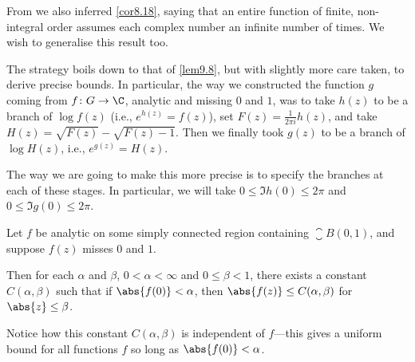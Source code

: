 From  we also inferred \autoref{cor8.18}, saying that an entire function of finite, non-integral order assumes each complex number an infinite number of times.
We wish to generalise this result too.

The strategy boils down to that of \autoref{lem9.8}, but with slightly more care taken, to derive precise bounds.
In particular, the way we constructed the function $g$ coming from $f \colon G \to \C$, analytic and missing $0$ and $1$, was to take $h(z)$ to be a branch of $\log f(z)$ (i.e., $e^{h(z)} = f(z)$), set $F(z) = \frac{1}{2 \pi i} h(z)$, and take $H(z) = \sqrt{F(z)} - \sqrt{F(z) - 1}$.
Then we finally took $g(z)$ to be a branch of $\log H(z)$, i.e., $e^{g(z)} = H(z)$.

The way we are going to make this more precise is to specify the branches at each of these stages.
In particular, we will take $0 \leq \Im h(0) \leq 2 \pi$ and $0 \leq \Im g(0) \leq 2 \pi$.

\begin{theorem}\label{thm9.11}
	Let $f$ be analytic on some simply connected region containing $\closure{B(0, 1)}$, and suppose $f(z)$ misses $0$ and $1$.

	Then for each $\alpha$ and $\beta$, $0 < \alpha < \infty$ and $0 \leq \beta < 1$, there exists a constant $C(\alpha, \beta)$ such that if $\abs{f(0)} < \alpha$, then $\abs{f(z)} \leq C(\alpha, \beta)$ for $\abs{z} \leq \beta$.
\end{theorem}

\begin{remark}
	Notice how this constant $C(\alpha, \beta)$ is independent of $f$---this gives a uniform bound for all functions $f$ so long as $\abs{f(0)} < \alpha$.
\end{remark}

